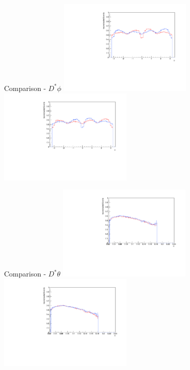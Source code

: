 \documentclass[11pt]{beamer}
\begin{document}
\begin{frame}{Comparison - $D^* \phi$}
\centering
\includegraphics[width=0.48\textwidth]{up_pdf/combined/h_phi_reco_Dst.pdf}
\includegraphics[width=0.48\textwidth]{down_pdf/combined/h_phi_reco_Dst.pdf}
\end{frame}
\begin{frame}{Comparison - $D^* \theta$}
\centering
\includegraphics[width=0.48\textwidth]{up_pdf/combined/h_theta_reco_Dst.pdf}
\includegraphics[width=0.48\textwidth]{down_pdf/combined/h_theta_reco_Dst.pdf}
\end{frame}
\end{document}
